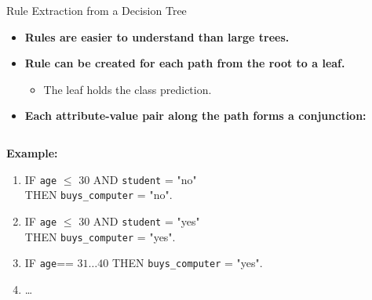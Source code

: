 \begin{frame}{Rule Extraction from a Decision Tree}
	\begin{itemize}
		\item \textbf{Rules are {\color{airforceblue}easier to understand} than large trees.}
		\item \textbf{Rule can be created for {\color{airforceblue}each path from the root to a leaf.}}
		      \begin{itemize}
			      \item The leaf holds the class prediction.
		      \end{itemize}
		\item \textbf{Each attribute-value pair along the path forms a conjunction:}
	\end{itemize}
	\vspace*{1em}
	\begin{columns}
		\begin{column}{0.55\textwidth}
			\textbf{Example:}
			\begin{enumerate}
				\item IF \texttt{age} $\leq$ 30 AND \texttt{student} = "no" \\
				      THEN \texttt{buys\_computer} = "no".
				\item IF \texttt{age} $\leq$ 30 AND \texttt{student} = "yes" \\
				      THEN \texttt{buys\_computer} = "yes".
				\item IF \texttt{age}== $31\ldots40$ THEN \texttt{buys\_computer} = "yes".
				\item \dots
			\end{enumerate}
		\end{column}
		\begin{column}{0.45\textwidth}
			\vspace*{-1em}
			\begin{figure}[h]
				\centering
				
			\end{figure}
		\end{column}
	\end{columns}
\end{frame}

